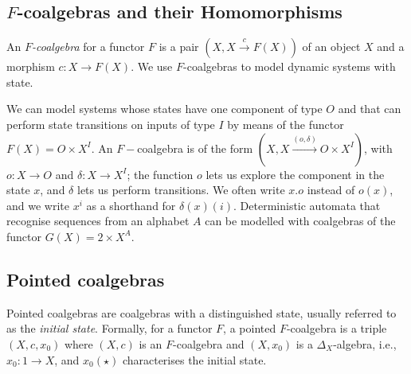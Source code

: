 \subsection{$F$-coalgebras and their Homomorphisms}
An \emph{$F$-coalgebra} for a functor $F$ is a pair $(X,X\xrightarrow{c}F(X))$ of an object $X$ and a morphism $c\colon X\rightarrow F(X)$. We use $F$-coalgebras to model dynamic systems with state. 
\begin{example}
We can model systems whose states have one component of type $O$ and that can perform state transitions on inputs of type $I$ by means of the functor $F(X)=O\times X^I$. An $F-$coalgebra is of the form $(X,X\xrightarrow{(o,\delta)}O\times X^I)$, with $o\colon X\rightarrow O$ and $\delta\colon X\rightarrow X^I$; the function $o$ lets us explore the component in the state $x$, and $\delta$ lets us perform transitions. We often write $x.o$ instead of $o(x)$, and we write $x^i$ as a shorthand for $\delta(x)(i)$. Deterministic automata that recognise sequences from an alphabet $A$ can be modelled with coalgebras of the functor $G(X)=2\times X^A$.
\end{example}
\subsection{Pointed coalgebras}
Pointed coalgebras are coalgebras with a distinguished state, usually referred to as the \emph{initial state}. Formally, for a functor $F$, a pointed $F$-coalgebra is a triple $(X,c, x_0)$ where $(X,c)$ is an $F$-coalgebra and $(X, x_0)$ is a $\Delta_X$-algebra, i.e., $x_0\colon 1\rightarrow X$, and $x_0(\star)$ characterises the initial state.
